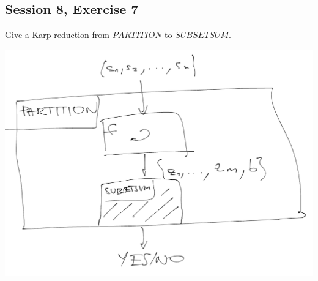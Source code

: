 \subsection {Session 8, Exercise 7}
\label{8_7}


Give a Karp-reduction from $PARTITION$ to $SUBSETSUM$.


\begin{center}
    \includegraphics[width=\linewidth]{./08/07/partition_karp_subsetsum.png}
\end{center}

